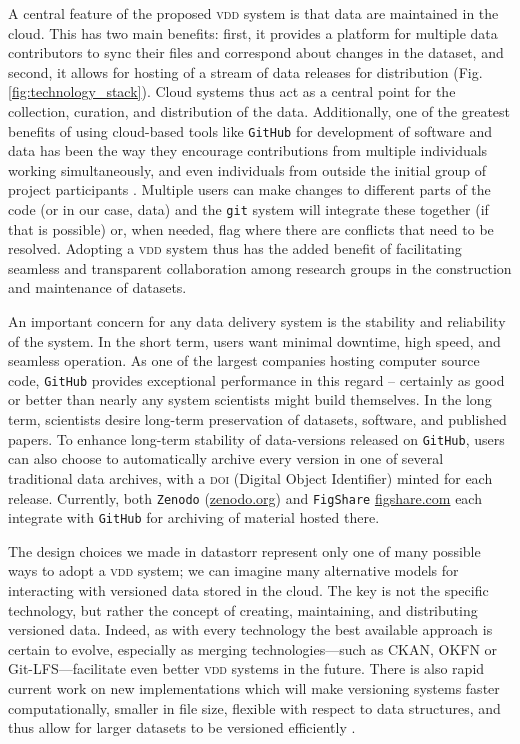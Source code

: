 \documentclass[a4paper,11pt]{article}
\newcommand{\smurl}[1]{{\footnotesize\href{https://#1}{#1}}}
\begin{document}
A central feature of the proposed  \textsc{vdd} system is that data are maintained in the cloud. This has two main benefits: first, it provides a platform for multiple data contributors to sync their files and correspond about changes in the dataset, and second, it allows for hosting of a stream of data releases for distribution (Fig. \ref{fig:technology_stack}). Cloud systems thus act as a central point for the collection, curation, and distribution of the data. Additionally, one of the greatest benefits of using cloud-based tools like  \texttt{GitHub} for development of software and data has been the way they encourage contributions from multiple individuals working simultaneously, and even individuals from outside the initial group of project participants \citep{Rogers-2013, Perkel-2016}. Multiple users can make changes to different parts of the code (or in our case, data) and the \texttt{git} system will integrate these together (if that is possible) or, when needed, flag where there are conflicts that need to be resolved. Adopting a \textsc{vdd} system thus has the added benefit of facilitating seamless and transparent collaboration among research groups in the construction and maintenance of datasets.

An important concern for any data delivery system is the stability and reliability of the system. In the short term, users want minimal downtime, high speed, and seamless operation. As one of the largest companies hosting computer source code, \texttt{GitHub} provides exceptional performance in this regard -- certainly as good or better than nearly any system scientists might build themselves. In the long term, scientists desire long-term preservation of datasets, software, and published papers. To enhance long-term stability of data-versions released on \texttt{GitHub}, users can also choose to automatically archive every version in one of several traditional data archives, with a \textsc{doi} (Digital Object Identifier) minted for each release. Currently, both \texttt{Zenodo} (\smurl{zenodo.org}) and  \texttt{FigShare} \smurl{figshare.com} each integrate with \texttt{GitHub} for archiving of material hosted there.

The design choices we made in datastorr represent only one of many possible ways to adopt a \textsc{vdd} system; we can imagine many alternative models for interacting with versioned data stored in the cloud. The key is not the specific technology, but rather the concept of creating, maintaining, and distributing versioned data. Indeed, as with every technology the best available approach is certain to evolve, especially as merging technologies---such as CKAN, OKFN or Git-LFS---facilitate even better \textsc{vdd} systems in the future.  There is also rapid current work on new implementations which will make versioning systems faster computationally, smaller in file size, flexible with respect to data structures, and thus allow for larger datasets to be versioned efficiently \citep{Fli, Dat}. 
\end{document}
